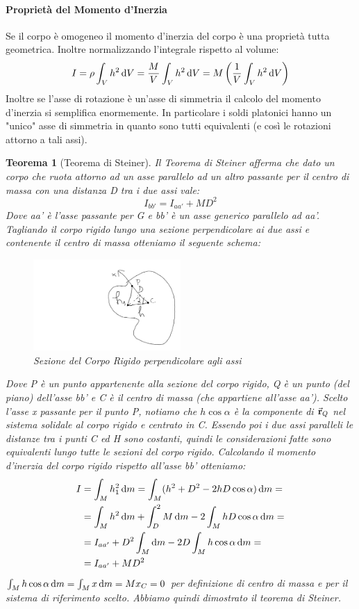 \documentclass{article}
\newtheorem{thm}{Teorema}[section]
\newcommand{\note}{\noindent {\quad \bf \underline{Osservazione:}} \quad}
\renewcommand{\r}{\va{r}}
\begin{document}
\paragraph{Proprietà del Momento d'Inerzia}
Se il corpo è omogeneo il momento d'inerzia del corpo è una proprietà tutta geometrica. Inoltre normalizzando l'integrale rispetto al volume:
\[I=\rho\int_Vh^2\dif V=\frac{M}{V}\int_Vh^2\dif V=M\left(\frac{1}{V}\int_Vh^2\dif V\right)\]
Inoltre se l'asse di rotazione è un'asse di simmetria il calcolo del momento d'inerzia si semplifica enormemente. In particolare i soldi platonici hanno un "unico" asse di simmetria in quanto sono tutti equivalenti (e così le rotazioni attorno a tali assi).
\begin{thm}[Teorema di Steiner]
Il Teorema di Steiner afferma che dato un corpo che ruota attorno ad un asse parallelo ad un altro passante per il centro di massa con una distanza D tra i due assi vale:
\[I_{bb'}=I_{aa'}+MD^2\]
Dove aa' è l'asse passante per G e bb' è un asse generico parallelo ad aa'. Tagliando il corpo rigido lungo una sezione perpendicolare ai due assi e contenente il centro di massa otteniamo il seguente schema:
\begin{figure}[H]
    \centering
    \includegraphics[width=0.5\textwidth]{TeoremaSteiner.png}
    \caption{Sezione del Corpo Rigido perpendicolare agli assi}
    \label{SezioneSteiner}
\end{figure}
Dove P è un punto appartenente alla sezione del corpo rigido, Q è un punto (del piano) dell'asse bb' e C è il centro di massa (che appartiene all'asse aa'). Scelto l'asse x passante per il punto P, notiamo che $h\cos\alpha$ è la componente di $\r_Q$ nel sistema solidale al corpo rigido e centrato in C. Essendo poi i due assi paralleli le distanze tra i punti C ed H sono costanti, quindi le considerazioni fatte sono equivalenti lungo tutte le sezioni del corpo rigido.
Calcolando il momento d'inerzia del corpo rigido rispetto all'asse bb' otteniamo:
\begin{equation}
\begin{split}
    I&=\int_Mh_1^2\dif m=\int_M(h^2+D^2-2hD\cos\alpha)\dif m=\\
    &=\int_Mh^2\dif m+\int_D^2M\dif m-2\int_MhD\cos\alpha\dif m=\\
    &=I_{aa'}+D^2\int_M\dif m-2D\int_Mh\cos\alpha\dif m=\\
    &=I_{aa'}+MD^2
\end{split}
\end{equation}
\note $\int_Mh\cos\alpha\dif m=\int_Mx\dif m=Mx_C=0$ per definizione di centro di massa e per il sistema di riferimento scelto.
Abbiamo quindi dimostrato il teorema di Steiner.
\end{thm}
\end{document}
